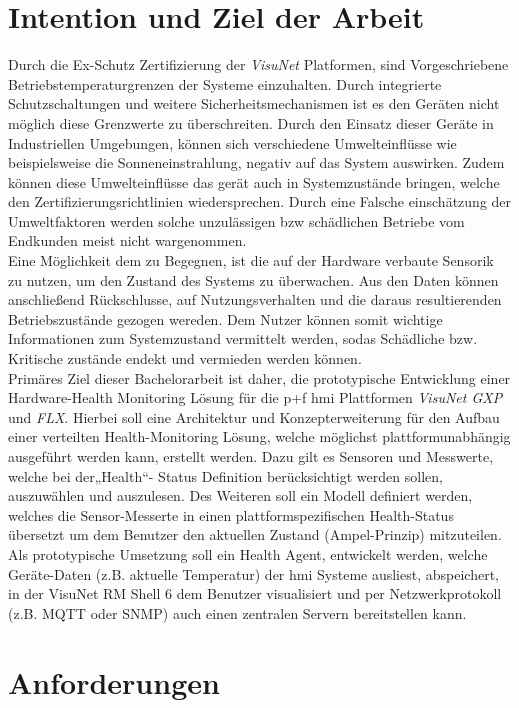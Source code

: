 \section{Intention und Ziel der Arbeit}
Durch die Ex-Schutz Zertifizierung der \textit{VisuNet} Platformen, sind Vorgeschriebene Betriebstemperaturgrenzen der Systeme einzuhalten. Durch integrierte Schutzschaltungen und weitere Sicherheitsmechanismen ist es den Geräten nicht möglich diese Grenzwerte zu überschreiten. Durch den Einsatz dieser Geräte in Industriellen Umgebungen, können sich verschiedene Umwelteinflüsse wie beispielsweise die Sonneneinstrahlung, negativ auf das System auswirken. Zudem können diese Umwelteinflüsse das gerät auch in Systemzustände bringen, welche den Zertifizierungsrichtlinien wiedersprechen. Durch eine Falsche einschätzung der Umweltfaktoren werden solche unzulässigen bzw schädlichen Betriebe vom Endkunden meist nicht wargenommen.\\
Eine Möglichkeit dem zu Begegnen, ist die auf  der Hardware verbaute Sensorik zu nutzen, um den Zustand des Systems zu überwachen. Aus den Daten können anschließend Rückschlusse, auf Nutzungsverhalten und die daraus resultierenden Betriebszustände gezogen wereden. Dem Nutzer können somit wichtige Informationen zum Systemzustand vermittelt werden, sodas Schädliche bzw. Kritische zustände endekt und vermieden werden können.\\
Primäres Ziel dieser Bachelorarbeit ist daher, die prototypische Entwicklung einer Hardware-Health Monitoring Lösung für die \acl{p+f} \ac{hmi} Plattformen \textit{VisuNet GXP} und \textit{FLX}. Hierbei soll eine Architektur und Konzepterweiterung für den Aufbau einer verteilten Health-Monitoring Lösung, welche möglichst plattformunabhängig ausgeführt werden kann, erstellt werden. Dazu gilt es Sensoren und Messwerte, welche bei der„Health“- Status Definition berücksichtigt werden sollen, auszuwählen und auszulesen. Des Weiteren soll ein Modell definiert werden, welches die Sensor-Messerte in einen plattformspezifischen Health-Status übersetzt um dem Benutzer den aktuellen Zustand (Ampel-Prinzip) mitzuteilen. Als prototypische Umsetzung soll ein Health Agent, entwickelt werden, welche Geräte-Daten (z.B. aktuelle Temperatur) der \ac{hmi} Systeme ausliest, abspeichert, in der VisuNet RM Shell 6 dem Benutzer visualisiert und per Netzwerkprotokoll (z.B. MQTT oder SNMP) auch einen zentralen Servern bereitstellen kann.    

\section{Anforderungen}
